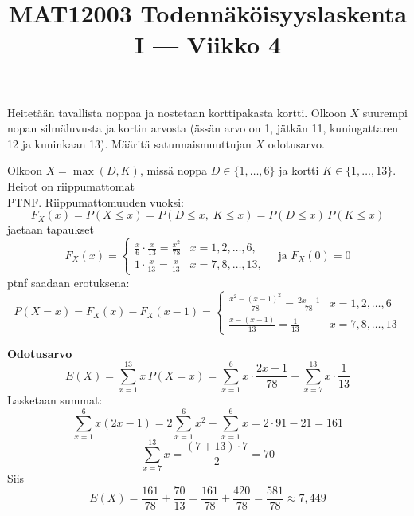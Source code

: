 \documentclass[12pt,a4paper]{article}
\title{MAT12003 Todennäköisyyslaskenta I — Viikko 4}
\date{}
\begin{document}
\maketitle

Heitetään tavallista noppaa ja nostetaan korttipakasta kortti. Olkoon $X$ suurempi nopan silmäluvusta ja kortin arvosta (ässän arvo on 1, jätkän 11, kuningattaren 12 ja kuninkaan 13). Määritä satunnaismuuttujan $X$ odotusarvo.

\vspace{0.4cm}
Olkoon $X=\max(D,K)$, missä
noppa $D\in\{1,\dots,6\}$ ja kortti $K\in\{1,\dots,13\}$.
Heitot on riippumattomat\\


PTNF. Riippumattomuuden vuoksi:
\[
F_X(x)=P(X\le x)=P(D\le x,\;K\le x)=P(D\le x)\,P(K\le x)
\]
jaetaan tapaukset
\[
F_X(x)=
\begin{cases}
\displaystyle \frac{x}{6}\cdot\frac{x}{13}=\frac{x^2}{78} & x=1,2,\dots,6,\\[6pt]
\displaystyle 1\cdot\frac{x}{13}=\frac{x}{13} & x=7,8,\dots,13,
\end{cases}
\quad\text{ja }F_X(0)=0
\]
ptnf saadaan erotuksena:
\[
P(X=x)=F_X(x)-F_X(x-1)=
\begin{cases}
\displaystyle \frac{x^2-(x-1)^2}{78}=\frac{2x-1}{78} & x=1,2,\dots,6\\[8pt]
\displaystyle \frac{x-(x-1)}{13}=\frac{1}{13} & x=7,8,\dots,13
\end{cases}
\]

\textbf{Odotusarvo} 
\[
E(X)=\sum_{x=1}^{13} x\,P(X=x)
=\sum_{x=1}^{6} x\cdot\frac{2x-1}{78}+\sum_{x=7}^{13} x\cdot\frac{1}{13}
\]
Lasketaan summat:
\[
\sum_{x=1}^{6} x(2x-1)=2\sum_{x=1}^{6}x^2-\sum_{x=1}^{6}x
=2\cdot 91-21=161
\]
\[
\sum_{x=7}^{13} x = \frac{(7+13)\cdot 7}{2}=70
\]
Siis
\[
E(X)=\frac{161}{78}+\frac{70}{13}
=\frac{161}{78}+\frac{420}{78}
=\frac{581}{78}\approx 7{,}449
\]

\end{document}
